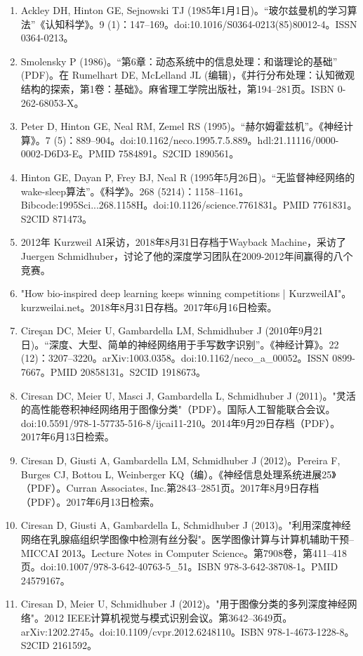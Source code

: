 \begin{enumerate}
\item Ackley DH, Hinton GE, Sejnowski TJ (1985年1月1日)。“玻尔兹曼机的学习算法”《认知科学》。9 (1)：147–169。doi:10.1016/S0364-0213(85)80012-4。ISSN 0364-0213。
\item Smolensky P (1986)。“第6章：动态系统中的信息处理：和谐理论的基础” (PDF)。在 Rumelhart DE, McLelland JL (编辑)，《并行分布处理：认知微观结构的探索，第1卷：基础》。麻省理工学院出版社，第194–281页。ISBN 0-262-68053-X。
\item Peter D, Hinton GE, Neal RM, Zemel RS (1995)。“赫尔姆霍兹机”。《神经计算》。7 (5)：889–904。doi:10.1162/neco.1995.7.5.889。hdl:21.11116/0000-0002-D6D3-E。PMID 7584891。S2CID 1890561。
\item Hinton GE, Dayan P, Frey BJ, Neal R (1995年5月26日)。“无监督神经网络的wake-sleep算法”。《科学》。268 (5214)：1158–1161。Bibcode:1995Sci...268.1158H。doi:10.1126/science.7761831。PMID 7761831。S2CID 871473。
\item 2012年 Kurzweil AI采访，2018年8月31日存档于Wayback Machine，采访了Juergen Schmidhuber，讨论了他的深度学习团队在2009-2012年间赢得的八个竞赛。
\item "How bio-inspired deep learning keeps winning competitions | KurzweilAI"。kurzweilai.net。2018年8月31日存档。2017年6月16日检索。
\item Cireşan DC, Meier U, Gambardella LM, Schmidhuber J (2010年9月21日)。“深度、大型、简单的神经网络用于手写数字识别”。《神经计算》。22 (12)：3207–3220。arXiv:1003.0358。doi:10.1162/neco_a_00052。ISSN 0899-7667。PMID 20858131。S2CID 1918673。
\item Ciresan DC, Meier U, Masci J, Gambardella L, Schmidhuber J (2011)。"灵活的高性能卷积神经网络用于图像分类"（PDF）。国际人工智能联合会议。doi:10.5591/978-1-57735-516-8/ijcai11-210。2014年9月29日存档（PDF）。2017年6月13日检索。
\item Ciresan D, Giusti A, Gambardella LM, Schmidhuber J (2012)。Pereira F, Burges CJ, Bottou L, Weinberger KQ（编）。《神经信息处理系统进展25》（PDF）。Curran Associates, Inc.第2843–2851页。2017年8月9日存档（PDF）。2017年6月13日检索。
\item Ciresan D, Giusti A, Gambardella L, Schmidhuber J (2013)。"利用深度神经网络在乳腺癌组织学图像中检测有丝分裂"。医学图像计算与计算机辅助干预–MICCAI 2013。Lecture Notes in Computer Science。第7908卷，第411–418页。doi:10.1007/978-3-642-40763-5_51。ISBN 978-3-642-38708-1。PMID 24579167。
\item Ciresan D, Meier U, Schmidhuber J (2012)。"用于图像分类的多列深度神经网络"。2012 IEEE计算机视觉与模式识别会议。第3642–3649页。arXiv:1202.2745。doi:10.1109/cvpr.2012.6248110。ISBN 978-1-4673-1228-8。S2CID 2161592。

\end{enumerate}
